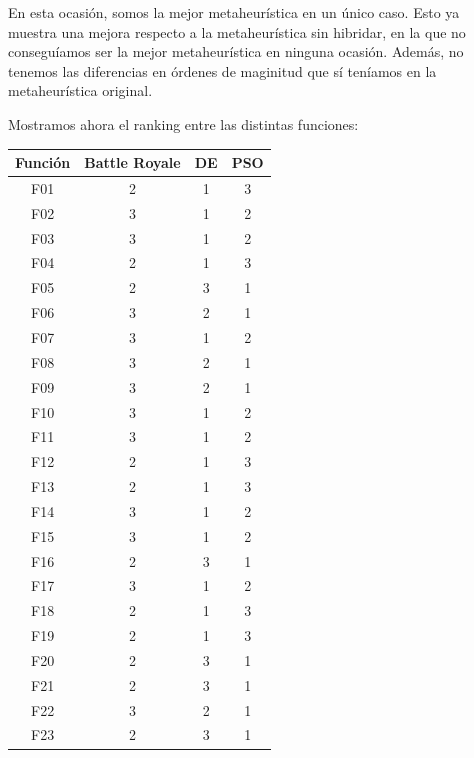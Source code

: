 \documentclass[11pt]{article}
\begin{document}
En esta ocasión, somos la mejor metaheurística en un único caso. Esto ya muestra una mejora respecto a la metaheurística sin hibridar, en la que no conseguíamos ser la mejor metaheurística en ninguna ocasión. Además, no tenemos las diferencias en órdenes de maginitud que sí teníamos en la metaheurística original.

Mostramos ahora el ranking entre las distintas funciones:

\begin{table}[H]
\centering
\begin{tabular}{|c|c|c|c|}
\hline
\textbf{Función} & \textbf{Battle Royale} &         \textbf{DE} &        \textbf{PSO} \\
\hline
F01  &             2 &      1 &      3 \\
F02  &             3 &      1 &      2 \\
F03  &             3 &      1 &      2 \\
F04  &             2 &      1 &      3 \\
F05  &             2 &      3 &      1 \\
F06  &             3 &      2 &      1 \\
F07  &             3 &      1 &      2 \\
F08  &             3 &      2 &      1 \\
F09  &             3 &      2 &      1 \\
F10  &             3 &      1 &      2 \\
F11  &             3 &      1 &      2 \\
F12  &             2 &      1 &      3 \\
F13  &             2 &      1 &      3 \\
F14  &             3 &      1 &      2 \\
F15  &             3 &      1 &      2 \\
F16  &             2 &      3 &      1 \\
F17  &             3 &      1 &      2 \\
F18  &             2 &      1 &      3 \\
F19  &             2 &      1 &      3 \\
F20  &             2 &      3 &      1 \\
F21  &             2 &      3 &      1 \\
F22  &             3 &      2 &      1 \\
F23  &             2 &      3 &      1 \\

\end{tabular}
\end{table}
\end{document}
